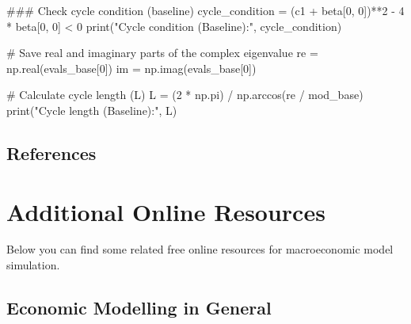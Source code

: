 \documentclass[
  letterpaper,
  DIV=11,
  numbers=noendperiod]{scrreprt}
\newenvironment{Shaded}{\begin{snugshade}}{\end{snugshade}}
\newcommand{\BuiltInTok}[1]{\textcolor[rgb]{0.00,0.23,0.31}{#1}}
\newcommand{\CommentTok}[1]{\textcolor[rgb]{0.37,0.37,0.37}{#1}}
\newcommand{\DecValTok}[1]{\textcolor[rgb]{0.68,0.00,0.00}{#1}}
\newcommand{\NormalTok}[1]{\textcolor[rgb]{0.00,0.23,0.31}{#1}}
\newcommand{\OperatorTok}[1]{\textcolor[rgb]{0.37,0.37,0.37}{#1}}
\newcommand{\StringTok}[1]{\textcolor[rgb]{0.13,0.47,0.30}{#1}}
\begin{document}
\begin{tcolorbox}
\begin{Shaded}
\begin{Highlighting}[]
\CommentTok{\#\#\# Check cycle condition (baseline)}
\NormalTok{cycle\_condition }\OperatorTok{=}\NormalTok{ (c1 }\OperatorTok{+}\NormalTok{ beta[}\DecValTok{0}\NormalTok{, }\DecValTok{0}\NormalTok{])}\OperatorTok{**}\DecValTok{2} \OperatorTok{{-}} \DecValTok{4} \OperatorTok{*}\NormalTok{ beta[}\DecValTok{0}\NormalTok{, }\DecValTok{0}\NormalTok{] }\OperatorTok{\textless{}} \DecValTok{0}
\BuiltInTok{print}\NormalTok{(}\StringTok{"Cycle condition (Baseline):"}\NormalTok{, cycle\_condition)}

\CommentTok{\# Save real and imaginary parts of the complex eigenvalue}
\NormalTok{re }\OperatorTok{=}\NormalTok{ np.real(evals\_base[}\DecValTok{0}\NormalTok{])}
\NormalTok{im }\OperatorTok{=}\NormalTok{ np.imag(evals\_base[}\DecValTok{0}\NormalTok{])}

\CommentTok{\# Calculate cycle length (L)}
\NormalTok{L }\OperatorTok{=}\NormalTok{ (}\DecValTok{2} \OperatorTok{*}\NormalTok{ np.pi) }\OperatorTok{/}\NormalTok{ np.arccos(re }\OperatorTok{/}\NormalTok{ mod\_base)}
\BuiltInTok{print}\NormalTok{(}\StringTok{"Cycle length (Baseline):"}\NormalTok{, L)}
\end{Highlighting}
\end{Shaded}

\end{tcolorbox}

\section{References}\label{references-15}


\chapter*{Additional Online
Resources}\label{additional-online-resources}


Below you can find some related free online resources for macroeconomic
model simulation.

\section*{Economic Modelling in
General}\label{economic-modelling-in-general}
\end{document}

